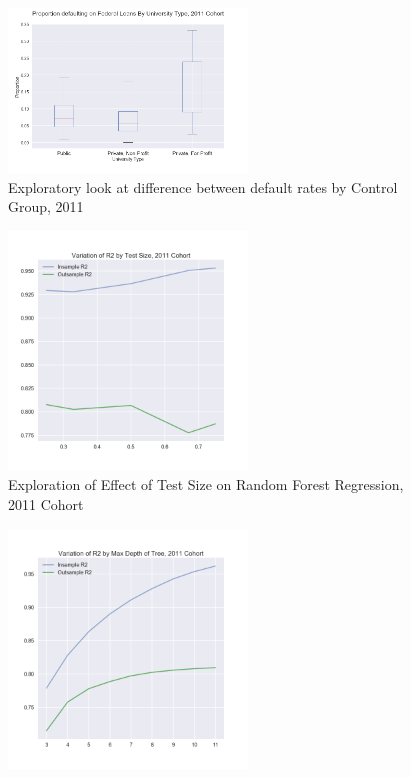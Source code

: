 \documentclass[10pt,twocolumn]{article}
\begin{document}
\begin{enumerate}
\begin{figure}[!t]
  \begin{center}
    \includegraphics[width=2.5in]{fedloans.png}
  \end{center}

  \caption{\Figure Exploratory look at difference between default rates by Control Group, 2011}
  \label{boxplot}
\end{figure}

\begin{figure}[!t]
  \begin{center}
    \includegraphics[width=2.5in]{Testsize.png}
  \end{center}

  \caption{\Figure Exploration of Effect of Test Size on Random Forest Regression, 2011 Cohort}
  \label{Testsize}
\end{figure}

\begin{figure}[!t]
  \begin{center}
    \includegraphics[width=2.5in]{Max_Depth.png}
  \end{center}


\end{figure}
\end{enumerate}
\end{document}
